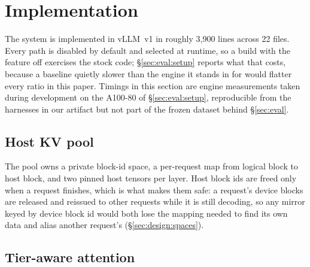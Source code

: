 %
%

\section{Implementation}
\label{sec:impl}

The system is implemented in vLLM~v1 in roughly 3{,}900 lines across 22 files.
Every path is disabled by default and selected at runtime, so a build with the
feature off exercises the stock code; \S\ref{sec:eval:setup} reports what that
costs, because a baseline quietly slower than the engine it stands in for would
flatter every ratio in this paper. Timings in this section are engine
measurements taken during development on the A100-80 of
\S\ref{sec:eval:setup}, reproducible from the harnesses in our artifact but not
part of the frozen dataset behind \S\ref{sec:eval}.

\subsection{Host KV pool}
\label{sec:impl:pool}

The pool owns a private block-id space, a per-request map from logical block to
host block, and two pinned host tensors per layer. Host block ids are freed only
when a request finishes, which is what makes them safe: a request's device
blocks are released and reissued to other requests while it is still decoding,
so any mirror keyed by device block id would both lose the mapping needed to
find its own data and alias another request's (\S\ref{sec:design:spaces}).

\subsection{Tier-aware attention}
\label{sec:impl:attn}

